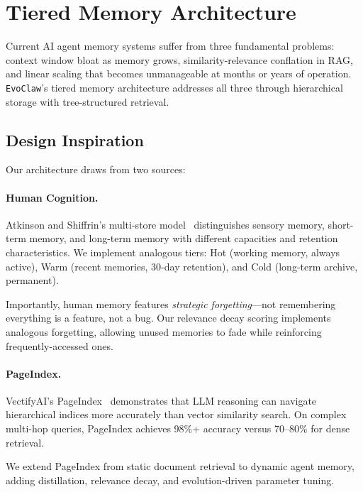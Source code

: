 \documentclass{article}
\newcommand{\evoclaw}{\texttt{EvoClaw}\xspace}
\begin{document}

\section{Tiered Memory Architecture}
\label{sec:memory}

Current AI agent memory systems suffer from three fundamental problems: context window bloat as memory grows, similarity-relevance conflation in RAG, and linear scaling that becomes unmanageable at months or years of operation. \evoclaw{}'s tiered memory architecture addresses all three through hierarchical storage with tree-structured retrieval.

\subsection{Design Inspiration}

Our architecture draws from two sources:

\paragraph{Human Cognition.} Atkinson and Shiffrin's multi-store model~\cite{atkinson1971human} distinguishes sensory memory, short-term memory, and long-term memory with different capacities and retention characteristics. We implement analogous tiers: Hot (working memory, always active), Warm (recent memories, 30-day retention), and Cold (long-term archive, permanent).

Importantly, human memory features \textit{strategic forgetting}—not remembering everything is a feature, not a bug. Our relevance decay scoring implements analogous forgetting, allowing unused memories to fade while reinforcing frequently-accessed ones.

\paragraph{PageIndex.} VectifyAI's PageIndex~\cite{vectifyai_pageindex} demonstrates that LLM reasoning can navigate hierarchical indices more accurately than vector similarity search. On complex multi-hop queries, PageIndex achieves 98\%+ accuracy versus 70--80\% for dense retrieval.

We extend PageIndex from static document retrieval to dynamic agent memory, adding distillation, relevance decay, and evolution-driven parameter tuning.
\end{document}

